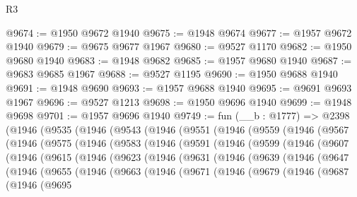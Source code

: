 \begin{lexlean}{R3}
\begin{coremodule}
@9674 := @1950 @9672 @1940
@9675 := @1948 @9674
@9677 := @1957 @9672 @1940
@9679 := @9675 @9677 @1967
@9680 := @9527 @1170
@9682 := @1950 @9680 @1940
@9683 := @1948 @9682
@9685 := @1957 @9680 @1940
@9687 := @9683 @9685 @1967
@9688 := @9527 @1195
@9690 := @1950 @9688 @1940
@9691 := @1948 @9690
@9693 := @1957 @9688 @1940
@9695 := @9691 @9693 @1967
@9696 := @9527 @1213
@9698 := @1950 @9696 @1940
@9699 := @1948 @9698
@9701 := @1957 @9696 @1940
@9749 := fun (__b : @1777) =>
  @2398
    (@1946
      (@9535
        (@1946
          (@9543
            (@1946
              (@9551
                (@1946
                  (@9559
                    (@1946
                      (@9567
                        (@1946
                          (@9575
                            (@1946
                              (@9583
                                (@1946
                                  (@9591
                                    (@1946
                                      (@9599
                                        (@1946
                                          (@9607
                                            (@1946
                                              (@9615
                                                (@1946
                                                  (@9623
                                                    (@1946
                                                      (@9631
                                                        (@1946
                                                          (@9639
                                                            (@1946
                                                              (@9647
                                                                (@1946
                                                                  (@9655
                                                                    (@1946
                                                                      (@9663
                                                                        (@1946
                                                                          (@9671
                                                                            (@1946
                                                                              (@9679
                                                                                (@1946
                                                                                  (@9687
                                                                                    (@1946
                                                                                      (@9695

\end{coremodule}
\end{lexlean}
